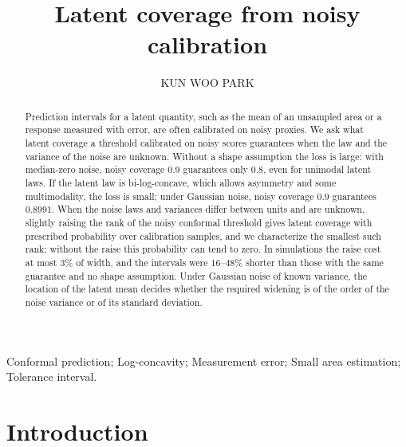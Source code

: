 \documentclass[lineno]{biometrika}
\begin{document}
\jvol{}
\jnum{}
\accessdate{}


\title{Latent coverage from noisy calibration}

\author{KUN WOO PARK}

\maketitle

\begin{abstract}
Prediction intervals for a latent quantity, such as the mean of an unsampled area or a response measured with error, are often calibrated on noisy proxies. We ask what latent coverage a threshold calibrated on noisy scores guarantees when the law and the variance of the noise are unknown. Without a shape assumption the loss is large: with median-zero noise, noisy coverage $0.9$ guarantees only $0.8$, even for unimodal latent laws. If the latent law is bi-log-concave, which allows asymmetry and some multimodality, the loss is small; under Gaussian noise, noisy coverage $0.9$ guarantees $0.8991$. When the noise laws and variances differ between units and are unknown, slightly raising the rank of the noisy conformal threshold gives latent coverage with prescribed probability over calibration samples, and we characterize the smallest such rank; without the raise this probability can tend to zero. In simulations the raise cost at most $3\%$ of width, and the intervals were $16$--$48\%$ shorter than those with the same guarantee and no shape assumption. Under Gaussian noise of known variance, the location of the latent mean decides whether the required widening is of the order of the noise variance or of its standard deviation.
\end{abstract}

\begin{keywords}
Conformal prediction; Log-concavity; Measurement error; Small area estimation; Tolerance interval.
\end{keywords}

\section{Introduction}\label{sec:intro}
\end{document}
